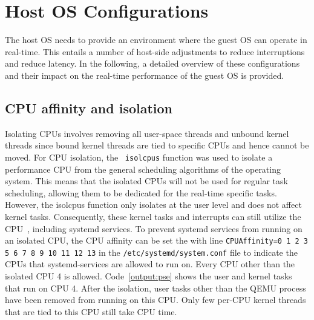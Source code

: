 \documentclass[MMR,Master,english]{twbook}
\begin{document}
\section{Host OS Configurations}\label{sec:host_configurations}
The host OS needs to provide an environment where the guest OS can operate in real-time. This entails a number of host-side adjustments to reduce interruptions and reduce latency. In the following, a detailed overview of these configurations and their impact on the real-time performance of the guest OS is provided.
\subsection{CPU affinity and isolation}\label{subsec:cpu_isolation}

Isolating CPUs involves removing all user-space threads and unbound kernel threads since bound kernel threads are tied to specific CPUs and hence cannot be moved. For CPU isolation, the ~\texttt{isolcpus} function was used to isolate a performance CPU from the general scheduling algorithms of the operating system. This means that the isolated CPUs will not be used for regular task scheduling, allowing them to be dedicated for the real-time specific tasks. However, the isolcpus function only isolates at the user level and does not affect kernel tasks. Consequently, these kernel tasks and interrupts can still utilize the CPU~\cite{maPerformanceTuningKVMbased}, including systemd services. To prevent systemd services from running on an isolated CPU, the CPU affinity can be set the with line \texttt{CPUAffinity=0 1 2 3 5 6 7 8 9 10 11 12 13} in the \texttt{/etc/systemd/system.conf} file to indicate the CPUs that systemd-services are allowed to run on. Every CPU other than the isolated CPU 4 is allowed. Code~\ref{output:pse} shows the user and kernel tasks that run on CPU 4. After the isolation, user tasks other than the QEMU process have been removed from running on this CPU. Only few per-CPU kernel threads that are tied to this CPU still take CPU time.
\end{document}
